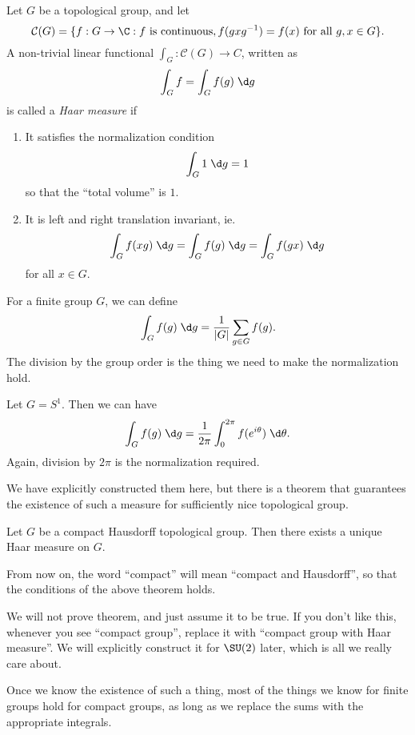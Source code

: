 \documentclass[a4paper]{article}
\begin{document}
\begin{defi}
  Let $G$ be a topological group, and let
  \[
    \mathcal{C}(G) = \{f: G \to \C: f\text{ is continuous}, f(gxg^{-1}) = f(x)\text{ for all }g, x \in G\}.
  \]
  A non-trivial linear functional $\int_G: \mathcal{C}(G) \to C$, written as
  \[
    \int_G f = \int_G f(g) \;\d g
  \]
  is called a \emph{Haar measure} if
  \begin{enumerate}
    \item It satisfies the normalization condition
      \[
        \int_G 1 \;\d g = 1
      \]
      so that the ``total volume'' is $1$.
    \item It is left and right translation invariant, ie.
      \[
        \int_G f(xg)\;\d g = \int_G f(g)\;\d g = \int_G f(gx) \;\d g
      \]
      for all $x \in G$.
  \end{enumerate}
\end{defi}

\begin{eg}
  For a finite group $G$, we can define
  \[
    \int_G f(g)\;\d g = \frac{1}{|G|} \sum_{g \in G} f(g).
  \]
  The division by the group order is the thing we need to make the normalization hold.
\end{eg}

\begin{eg}
  Let $G = S^1$. Then we can have
  \[
    \int_G f(g)\;\d g = \frac{1}{2\pi} \int_0^{2\pi} f(e^{i\theta})\;\d \theta.
  \]
  Again, division by $2\pi$ is the normalization required.
\end{eg}

We have explicitly constructed them here, but there is a theorem that guarantees the existence of such a measure for sufficiently nice topological group.

\begin{thm}
  Let $G$ be a compact Hausdorff topological group. Then there exists a unique Haar measure on $G$.
\end{thm}
From now on, the word ``compact'' will mean ``compact and Hausdorff'', so that the conditions of the above theorem holds.

We will not prove theorem, and just assume it to be true. If you don't like this, whenever you see ``compact group'', replace it with ``compact group with Haar measure''. We will explicitly construct it for $\SU(2)$ later, which is all we really care about.

Once we know the existence of such a thing, most of the things we know for finite groups hold for compact groups, as long as we replace the sums with the appropriate integrals.
\end{document}
